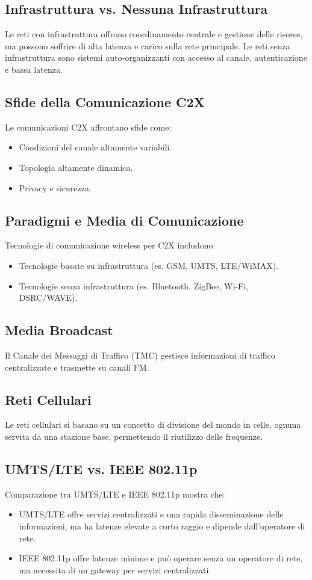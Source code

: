 \subsection{Infrastruttura vs. Nessuna Infrastruttura}
Le reti con infrastruttura offrono coordinamento centrale e gestione delle risorse, ma possono soffrire di alta latenza e carico sulla rete principale. Le reti senza infrastruttura sono sistemi auto-organizzanti con accesso al canale, autenticazione e bassa latenza.

\subsection{Sfide della Comunicazione C2X}
Le comunicazioni C2X affrontano sfide come:
\begin{itemize}
    \item Condizioni del canale altamente variabili.
    \item Topologia altamente dinamica.
    \item Privacy e sicurezza.
\end{itemize}

\subsection{Paradigmi e Media di Comunicazione}
Tecnologie di comunicazione wireless per C2X includono:
\begin{itemize}
    \item Tecnologie basate su infrastruttura (es. GSM, UMTS, LTE/WiMAX).
    \item Tecnologie senza infrastruttura (es. Bluetooth, ZigBee, Wi-Fi, DSRC/WAVE).
\end{itemize}

\subsection{Media Broadcast}
Il Canale dei Messaggi di Traffico (TMC) gestisce informazioni di traffico centralizzate e trasmette su canali FM.

\subsection{Reti Cellulari}
Le reti cellulari si basano su un concetto di divisione del mondo in celle, ognuna servita da una stazione base, permettendo il riutilizzo delle frequenze.

\subsection{UMTS/LTE vs. IEEE 802.11p}
Comparazione tra UMTS/LTE e IEEE 802.11p mostra che:
\begin{itemize}
    \item UMTS/LTE offre servizi centralizzati e una rapida disseminazione delle informazioni, ma ha latenze elevate a corto raggio e dipende dall'operatore di rete.
    \item IEEE 802.11p offre latenze minime e può operare senza un operatore di rete, ma necessita di un gateway per servizi centralizzati.
\end{itemize}

